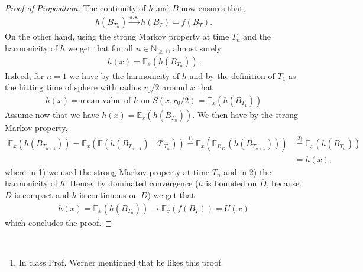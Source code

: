 \documentclass[../mainfile.tex]{subfiles}
\begin{document}
\begin{proof}[Proof of Proposition]
The continuity of $h$ and $B$ now ensures that,
\begin{align*}
h(B_{T_n}) \overset{a.s.}\longrightarrow h(B_T)=f(B_T).
\end{align*}
On the other hand, using the strong Markov property at time $T_n$ and the harmonicity of $h$ we get that for all $n \in \mathbb{N}_{ \geq 1}$, almost surely 
\begin{align*}
h(x)= \mathbb{E}_x(h(B_{T_n})).
\end{align*}
Indeed, for $n=1$ we have by the harmonicity of $h$ and by the definition of $T_1$ as the hitting time of sphere with radius $r_0/2$ around $x$ that
\begin{align*}
h(x)= \text{mean value of $h$ on } S(x,r_0/2)= \mathbb{E}_x(h(B_{T_1}))
\end{align*}
Assume now that we have $h(x)= \mathbb{E}_x(h(B_{T_n}))$. We then have by the strong Markov property,
\begin{align*}
\mathbb{E}_x(h(B_{T_{n+1}})) = \mathbb{E}_x( \mathbb{E}( h(B_{T_{n+1}}) \mid \mathcal{F}_{T_n})) \overset{1)}= \mathbb{E}_x( \mathbb{E}_{B_{T_n}}( h(B_{T_{n+1}})))& \overset{2)}= \mathbb{E}_x(h(B_{T_n})) \\ &=h(x),
\end{align*}
where in 1) we used the strong Markov property at time $T_n$ and in 2) the harmonicity of $h$. Hence, by dominated convergence ($h$ is bounded on $\overline{D}$, because $\overline{D}$ is compact and $h$ is continuous on $\overline{D}$) we get that
\begin{align*}
h(x)= \mathbb{E}_x(h(B_{T_n})) \to \mathbb{E}_x(f(B_T))=U(x)
\end{align*}
which concludes the proof.
\end{proof}
\begin{rem} \
\begin{enumerate}
\item In class Prof. Werner mentioned that he likes this proof.
\end{enumerate}

\end{rem}
\newpage
\end{document}
